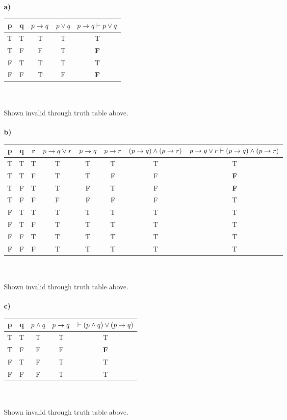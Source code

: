 \documentclass[12pt,oneside,reqno]{amsart}
\begin{document}
\textbf{a)}\\
	\begin{tabular}{ cc|c|c|c }
		p & q & $p \rightarrow{} q$ & $p \lor q$ & $p \rightarrow{} q \vdash p \lor q$ \\ \hline
		T & T & 	T & T & T \\
		T & F & 	F & T & \textbf{F} \\
		F & T & 	T & T & T \\
		F & F & 	T & F & \textbf{F} \\
	\end{tabular}\\\\
	Shown invalid through truth table above.\\\\

\textbf{b)}\\
	\begin{tabular}{ ccc|c|c|c|c|c }
		p & q & r & $p \rightarrow{} q \lor r$ & $p \rightarrow{} q$ & $p \rightarrow{} r$ & $(p \rightarrow{} q) \land (p \rightarrow{} r)$ & $p \rightarrow{} q \lor r \vdash (p \rightarrow{} q) \land (p \rightarrow{} r)$  \\ \hline
		T & T & T &	 T & T & T & T & T \\
		T & T & F &	 T & T & F & F & \textbf{F} \\
		T & F & T &	 T & F & T & F & \textbf{F} \\
		T & F & F &	 F & F & F & F & T \\
		F & T & T &	 T & T & T & T & T \\
		F & T & F &	 T & T & T & T & T \\
		F & F & T &	 T & T & T & T & T \\
		F & F & F &	 T & T & T & T & T \\
	\end{tabular}\\\\
	Shown invalid through truth table above.\\\\

\textbf{c)}\\
	\begin{tabular}{ cc|c|c|c }
		p & q & $p \land q$ & $p \rightarrow{} q$ & $\vdash (p \land q) \lor (p \rightarrow{} q)$ \\ \hline
		T & T & 	T & T & T \\
		T & F & 	F & F & \textbf{F} \\
		F & T & 	F & T & T \\
		F & F & 	F & T & T \\
	\end{tabular}\\\\
	Shown invalid through truth table above.\\\\
\end{document}
